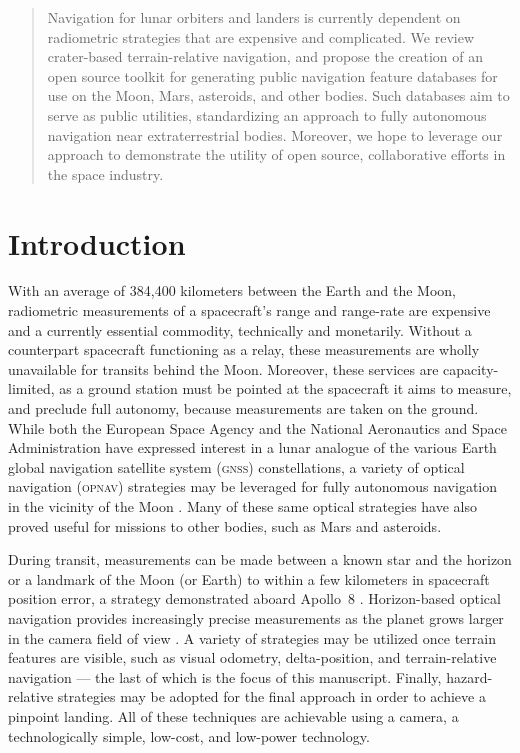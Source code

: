 \documentclass[12pt]{article}
\begin{document}
\maketitle

\begin{abstract}
Navigation for lunar orbiters and landers is currently dependent on radiometric strategies that are expensive and complicated. We review crater-based terrain-relative navigation, and propose the creation of an open source toolkit for generating public navigation feature databases for use on the Moon, Mars, asteroids, and other bodies. Such databases aim to serve as public utilities, standardizing an approach to fully autonomous navigation near extraterrestrial bodies. Moreover, we hope to leverage our approach to demonstrate the utility of open source, collaborative efforts in the space industry.
\end{abstract}

\section{Introduction}
With an average of 384,400 kilometers between the Earth and the Moon, radiometric measurements of a spacecraft's range and range-rate are expensive and a currently essential commodity, technically and monetarily. Without a counterpart spacecraft functioning as a relay, these measurements are wholly unavailable for transits behind the Moon. Moreover, these services are capacity-limited, as a ground station must be pointed at the spacecraft it aims to measure, and preclude full autonomy, because measurements are taken on the ground. While both the European Space Agency and the National Aeronautics and Space Administration have expressed interest in a lunar analogue of the various Earth global navigation satellite system (\textsc{gnss}) constellations, a variety of optical navigation (\textsc{opnav}) strategies may be leveraged for fully autonomous navigation in the vicinity of the Moon \citep{Christian2009}. Many of these same optical strategies have also proved useful for missions to other bodies, such as Mars and asteroids.

During transit, measurements can be made between a known star and the horizon or a landmark of the Moon (or Earth) to within a few kilometers in spacecraft position error, a strategy demonstrated aboard Apollo~8 \citep{Christian2009,Hoag1976}. Horizon-based optical navigation provides increasingly precise measurements as the planet grows larger in the camera field of view \citep{Christian2016,Christian2017}. A variety of strategies may be utilized once terrain features are visible, such as visual odometry, delta-position, and terrain-relative navigation --- the last of which is the focus of this manuscript. Finally, hazard-relative strategies may be adopted for the final approach in order to achieve a pinpoint landing. All of these techniques are achievable using a camera, a technologically simple, low-cost, and low-power technology.
\end{document}
